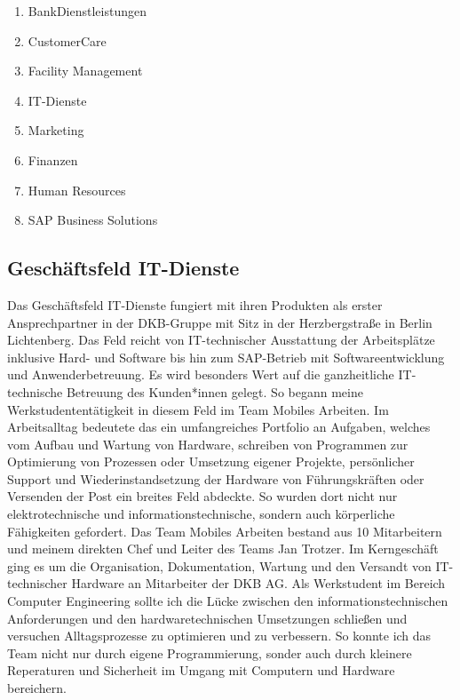 \begin{enumerate}
	\item BankDienstleistungen
	\item CustomerCare
	\item Facility Management
	\item IT-Dienste
	\item Marketing
	\item Finanzen
	\item Human Resources
	\item SAP Business Solutions
\end{enumerate}

\subsection{Geschäftsfeld IT-Dienste}\label{einleitung}


Das Geschäftsfeld IT-Dienste fungiert mit ihren Produkten als erster Ansprechpartner in der DKB-Gruppe mit Sitz in der Herzbergstraße in Berlin Lichtenberg. Das Feld reicht von IT-technischer Ausstattung der Arbeitsplätze inklusive Hard- und Software bis hin zum SAP-Betrieb mit Softwareentwicklung und Anwenderbetreuung. Es wird besonders Wert auf die ganzheitliche IT-technische Betreuung des Kunden*innen gelegt. So begann meine Werkstudententätigkeit in diesem Feld im Team Mobiles Arbeiten. Im Arbeitsalltag bedeutete das ein umfangreiches Portfolio an Aufgaben, welches vom Aufbau und Wartung von Hardware, schreiben von Programmen zur Optimierung von Prozessen oder Umsetzung eigener Projekte, persönlicher Support und  Wiederinstandsetzung der Hardware von Führungskräften oder Versenden der Post ein breites Feld abdeckte.  So wurden dort nicht nur elektrotechnische und informationstechnische, sondern auch körperliche Fähigkeiten gefordert. Das Team Mobiles Arbeiten bestand aus 10 Mitarbeitern und meinem direkten Chef und Leiter des Teams Jan Trotzer. Im Kerngeschäft ging es um die Organisation, Dokumentation, Wartung und den Versandt von IT-technischer Hardware an Mitarbeiter der DKB AG. Als Werkstudent im Bereich Computer Engineering sollte ich die Lücke zwischen den informationstechnischen Anforderungen und den hardwaretechnischen Umsetzungen schließen und versuchen Alltagsprozesse zu optimieren und zu verbessern. So konnte ich das Team nicht nur durch eigene Programmierung, sonder auch durch kleinere Reperaturen und Sicherheit im Umgang mit Computern und Hardware bereichern. 

